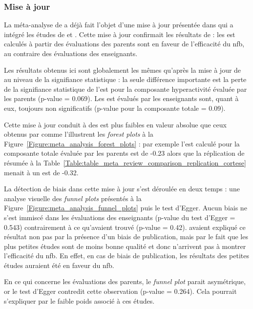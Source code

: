 \subsubsection{Mise à jour}

La méta-analyse de \citep{Cortese2016} a déjà fait l'objet d'une mise à jour présentée dans \citet{Bussalb2019clinical} qui a intégré les études de 
\citep{Bazanova2018, Baumeister2016} et \citet{Strehl2017}. Cette mise à jour confirmait les résultats de \citep{Cortese2016} : les \gls{est} calculés 
à partir des évaluations des parents sont en faveur de l'efficacité du \gls{nfb}, au contraire des évaluations des enseignants. 

Les résultats obtenus ici sont globalement les mêmes qu'après la mise à jour de \citet{Bussalb2019clinical} au niveau de la signifiance statistique : la seule
différence importante est la perte de la signifiance statistique de l'\gls{est} pour la composante hyperactivité évaluée par les parents (p-value = 0.069).
Les \gls{est} évalués par les enseignants sont, quant à eux, toujours non significatifs (p-value pour la composante totale =  0.09). 

Cette mise à jour conduit à des \gls{est} plus faibles en valeur absolue que ceux obtenus par \citet{Cortese2016} comme l'illustrent les \textit{forest plots} à 
la Figure~\ref{Figure:meta_analysis_forest_plots} : par exemple l'\gls{est} calculé pour la composante totale évaluée par les parents est de -0.23 alors
que la réplication de \citet{Cortese2016} résumée à la Table~\ref{Table:table_meta_review_comparison_replication_cortese} menait à un \gls{est} de -0.32.

La détection de biais dans cette mise à jour s'est déroulée en deux temps : une analyse visuelle des \textit{funnel plots} présentés à la Figure~\ref{Figure:meta_analysis_funnel_plots}
puis le test d'Egger. Aucun biais ne s'est immiscé dans les évaluations des enseignants (p-value du test d'Egger = 0.543) contrairement à ce qu'avaient trouvé \citet{Cortese2016} (p-value = 0.42). 
\citet{Cortese2016} avaient expliqué ce résultat non pas par la présence d'un biais de publication, mais par le fait que les plus petites études sont 
de moins bonne qualité et donc n'arrivent pas à montrer l'efficacité du \gls{nfb}. En effet, en cas de biais de publication, les résultats des petites
études auraient été en faveur du \gls{nfb}. 

En ce qui concerne les évaluations des parents, le \textit{funnel plot} parait asymétrique, or le test d'Egger contredit cette observation (p-value = 0.264). 
Cela pourrait s'expliquer par le faible poids associé à ces études. 

